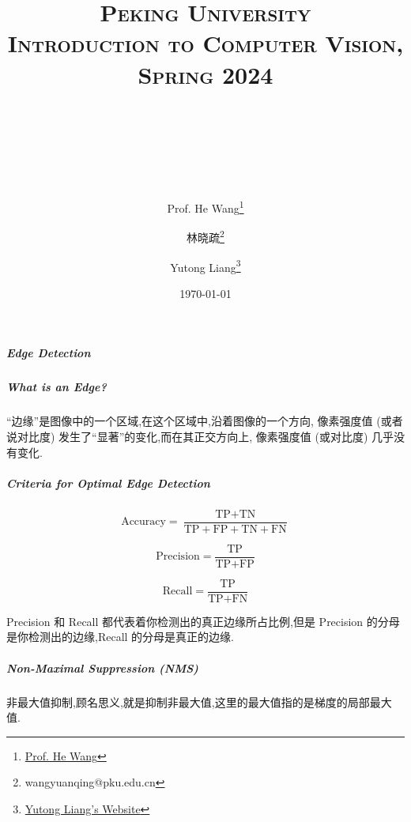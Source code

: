 

\title{
{\normalfont\normalsize\textsc{
Peking University\\
Introduction to Computer Vision, Spring 2024 \\[25pt]}}
\horrule{0.5pt}\\
\\
\horrule{1.8pt}\\[20pt]
}

\author[1]{Prof. He Wang\thanks{\href{https://hughw19.github.io/}{Prof. He Wang}}}
\author[2]{林晓疏\thanks{wangyuanqing@pku.edu.cn}}
\author[2]{Yutong Liang\thanks{\href{https://lyt0112.com/}{Yutong Liang's Website}}}

\date{\today}

\pagestyle{fancy}
\fancyhf{}
\fancyhead[L]{\leftmark}  %
\fancyfoot[C]{\thepage}  %




\subparagraph{Edge Detection}
 
\subparagraph{What is an Edge?}

“边缘”是图像中的一个区域,在这个区域中,沿着图像的一个方向,
像素强度值 (或者说对比度) 发生了“显著”的变化,而在其正交方向上,
像素强度值 (或对比度) 几乎没有变化.

\subparagraph{Criteria for Optimal Edge Detection}

\begin{equation}
\text{Accuracy}=\frac{\text{TP}+\text{TN}}{\text{TP}+\text{FP}+\text{TN}+\text{FN}} 
\end{equation}

\begin{equation}
\text{Precision}=\frac{\text{TP}}{\text{TP}+\text{FP}} 
\end{equation}

\begin{equation}
\text{Recall}=\frac{\text{TP}}{\text{TP}+\text{FN}}
\end{equation}

Precision 和 Recall 都代表着你检测出的真正边缘所占比例,但是 Precision 的分母
是你检测出的边缘,Recall 的分母是真正的边缘.

\subparagraph{Non-Maximal Suppression (NMS)}

非最大值抑制,顾名思义,就是抑制非最大值,这里的最大值指的是梯度的局部最大值.

